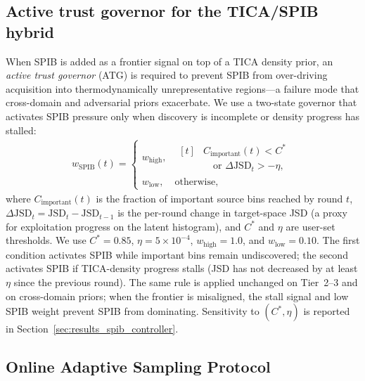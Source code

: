 \documentclass[journal=jctcce,manuscript=article,layout=twocolumn]{achemso}
\begin{document}
\subsection{Active trust governor for the TICA/SPIB hybrid}
\label{sec:methods_trust_controller}

When SPIB is added as a frontier signal on top of a TICA density prior, an \emph{active trust governor} (ATG) is required to prevent SPIB from over-driving acquisition into thermodynamically unrepresentative regions---a failure mode that cross-domain and adversarial priors exacerbate. We use a two-state governor that activates SPIB pressure only when discovery is incomplete or density progress has stalled:
\begin{equation}
\label{eq:trust_controller_online}
\begin{aligned}
    w_{\mathrm{SPIB}}(t) =
    \begin{cases}
    w_{\mathrm{high}}, &
    \begin{aligned}[t]
        &C_{\mathrm{important}}(t) < C^* \\
        &\quad\text{or }\Delta\mathrm{JSD}_t > -\eta,
    \end{aligned} \\
    w_{\mathrm{low}}, & \text{otherwise},
    \end{cases}
\end{aligned}
\end{equation}
where $C_{\mathrm{important}}(t)$ is the fraction of important source bins reached by round $t$, $\Delta\mathrm{JSD}_t = \mathrm{JSD}_t-\mathrm{JSD}_{t-1}$ is the per-round change in target-space JSD (a proxy for exploitation progress on the latent histogram), and $C^*$ and $\eta$ are user-set thresholds. We use $C^*=0.85$, $\eta=5\times 10^{-4}$, $w_{\mathrm{high}}=1.0$, and $w_{\mathrm{low}}=0.10$. The first condition activates SPIB while important bins remain undiscovered; the second activates SPIB if TICA-density progress stalls (JSD has not decreased by at least $\eta$ since the previous round). The same rule is applied unchanged on Tier~2--3 and on cross-domain priors; when the frontier is misaligned, the stall signal and low SPIB weight prevent SPIB from dominating. Sensitivity to $(C^*,\eta)$ is reported in Section~\ref{sec:results_spib_controller}.

\subsection{Online Adaptive Sampling Protocol}
\end{document}
